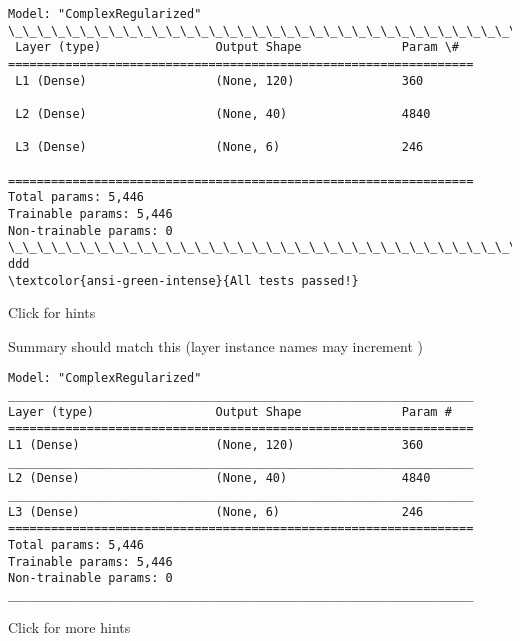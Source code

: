 \documentclass[11pt]{article}
\begin{document}
    \begin{Verbatim}[commandchars=\\\{\}]
Model: "ComplexRegularized"
\_\_\_\_\_\_\_\_\_\_\_\_\_\_\_\_\_\_\_\_\_\_\_\_\_\_\_\_\_\_\_\_\_\_\_\_\_\_\_\_\_\_\_\_\_\_\_\_\_\_\_\_\_\_\_\_\_\_\_\_\_\_\_\_\_
 Layer (type)                Output Shape              Param \#
=================================================================
 L1 (Dense)                  (None, 120)               360

 L2 (Dense)                  (None, 40)                4840

 L3 (Dense)                  (None, 6)                 246

=================================================================
Total params: 5,446
Trainable params: 5,446
Non-trainable params: 0
\_\_\_\_\_\_\_\_\_\_\_\_\_\_\_\_\_\_\_\_\_\_\_\_\_\_\_\_\_\_\_\_\_\_\_\_\_\_\_\_\_\_\_\_\_\_\_\_\_\_\_\_\_\_\_\_\_\_\_\_\_\_\_\_\_
ddd
\textcolor{ansi-green-intense}{All tests passed!}
    \end{Verbatim}

    Click for hints

Summary should match this (layer instance names may increment )

\begin{verbatim}
Model: "ComplexRegularized"
_________________________________________________________________
Layer (type)                 Output Shape              Param #   
=================================================================
L1 (Dense)                   (None, 120)               360       
_________________________________________________________________
L2 (Dense)                   (None, 40)                4840      
_________________________________________________________________
L3 (Dense)                   (None, 6)                 246       
=================================================================
Total params: 5,446
Trainable params: 5,446
Non-trainable params: 0
_________________________________________________________________
\end{verbatim}

Click for more hints
\end{document}

